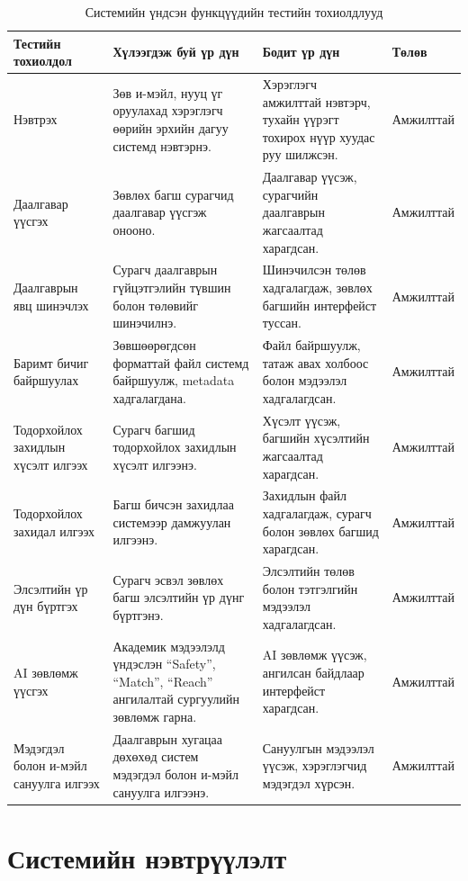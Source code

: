 \begin{table}[H]
\centering
\caption{Системийн үндсэн функцүүдийн тестийн тохиолдлууд}
\label{tab:system-test-cases}
{\small
\renewcommand{\arraystretch}{1.25}
\begin{tabular}{|p{3.2cm}|p{4.2cm}|p{4.2cm}|p{2cm}|}
\hline
\textbf{Тестийн тохиолдол} & \textbf{Хүлээгдэж буй үр дүн} & \textbf{Бодит үр дүн} & \textbf{Төлөв} \\
\hline
Нэвтрэх & Зөв и-мэйл, нууц үг оруулахад хэрэглэгч өөрийн эрхийн дагуу системд нэвтэрнэ. & Хэрэглэгч амжилттай нэвтэрч, тухайн үүрэгт тохирох нүүр хуудас руу шилжсэн. & Амжилттай \\
\hline
Даалгавар үүсгэх & Зөвлөх багш сурагчид даалгавар үүсгэж онооно. & Даалгавар үүсэж, сурагчийн даалгаврын жагсаалтад харагдсан. & Амжилттай \\
\hline
Даалгаврын явц шинэчлэх & Сурагч даалгаврын гүйцэтгэлийн түвшин болон төлөвийг шинэчилнэ. & Шинэчилсэн төлөв хадгалагдаж, зөвлөх багшийн интерфейст туссан. & Амжилттай \\
\hline
Баримт бичиг байршуулах & Зөвшөөрөгдсөн форматтай файл системд байршуулж, metadata хадгалагдана. & Файл байршуулж, татаж авах холбоос болон мэдээлэл хадгалагдсан. & Амжилттай \\
\hline
Тодорхойлох захидлын хүсэлт илгээх & Сурагч багшид тодорхойлох захидлын хүсэлт илгээнэ. & Хүсэлт үүсэж, багшийн хүсэлтийн жагсаалтад харагдсан. & Амжилттай \\
\hline
Тодорхойлох захидал илгээх & Багш бичсэн захидлаа системээр дамжуулан илгээнэ. & Захидлын файл хадгалагдаж, сурагч болон зөвлөх багшид харагдсан. & Амжилттай \\
\hline
Элсэлтийн үр дүн бүртгэх & Сурагч эсвэл зөвлөх багш элсэлтийн үр дүнг бүртгэнэ. & Элсэлтийн төлөв болон тэтгэлгийн мэдээлэл хадгалагдсан. & Амжилттай \\
\hline
AI зөвлөмж үүсгэх & Академик мэдээлэлд үндэслэн ``Safety'', ``Match'', ``Reach'' ангилалтай сургуулийн зөвлөмж гарна. & AI зөвлөмж үүсэж, ангилсан байдлаар интерфейст харагдсан. & Амжилттай \\
\hline
Мэдэгдэл болон и-мэйл сануулга илгээх & Даалгаврын хугацаа дөхөхөд систем мэдэгдэл болон и-мэйл сануулга илгээнэ. & Сануулгын мэдээлэл үүсэж, хэрэглэгчид мэдэгдэл хүрсэн. & Амжилттай \\
\hline
\end{tabular}
}
\end{table}

\section{Системийн нэвтрүүлэлт}

